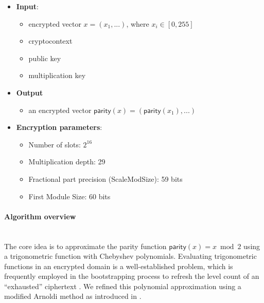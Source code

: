 \documentclass[article]{iacrtrans}
\begin{document}
\begin{itemize}
    \item \textbf{Input}: 
        \begin{itemize}
            \item encrypted vector $x = (x_1, ... )$, where $x_i \in [0, 255]$
            \item cryptocontext
            \item public key
            \item multiplication key
        \end{itemize}
    \item \textbf{Output}
        \begin{itemize}
            \item an encrypted vector  $\textsf{parity}(x) = (\textsf{parity}(x_1), ... )$
        \end{itemize}
    \item \textbf{Encryption parameters}:
        \begin{itemize}
            \item Number of slots: $2^{16}$ 
            \item Multiplication depth: 29
            \item Fractional part precision (ScaleModSize): 59 bits
            \item First Module Size: 60 bits
        \end{itemize}
\end{itemize}    




\paragraph{Algorithm overview}\mbox{}\\

The core idea is to approximate the parity function $\textsf{parity}(x) = x \bmod 2$ using a trigonometric function with Chebyshev polynomials. Evaluating trigonometric functions in an encrypted domain is a well-established problem, which is frequently employed in the bootstrapping process to refresh the level count of an ``exhausted'' ciphertext \cite{Bossuat2021}. We refined this polynomial approximation using a modified Arnoldi method as introduced in \cite{Brubeck2021}.
\end{document}

